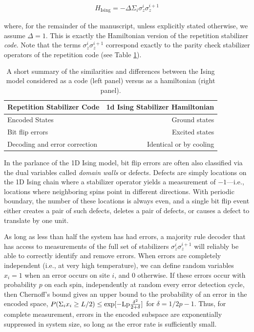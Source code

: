 \documentclass[twocolumn,superscriptaddress,aps,prb,floatfix]{revtex4-1}
\newcommand{\Hising}{H_{\mathrm{Ising}}}
\renewcommand*{\emph}[1]{{\it {#1}}}
\begin{document}
\begin{align}
\Hising = -\Delta \Sigma_i \sigma^i_z \sigma^{i+1}_z
\label{eq:isingham}
\end{align}

where, for the remainder of the manuscript, unless explicitly stated otherwise, we assume $\Delta=1$.  This is exactly the Hamiltonian version of the repetition stabilizer \emph{code}\cite{Freeman2017}.  Note that the terms $\sigma^i_z \sigma^{i+1}_z$ correspond exactly to the parity check stabilizer operators of the repetition code (see Table \ref{tab:code_vs_hamiltonian}).

\begin{table}
\begin{center}
  \begin{tabular}{ l | r }
    \hline
    Repetition Stabilizer Code & 1d Ising Stabilizer Hamiltonian \\ \hline
    Encoded States & Ground states \\ \hline
    Bit flip errors & Excited states \\ \hline
    Decoding and error correction & Identical or by cooling \\ \hline
    \hline
  \end{tabular}
\end{center}
\caption{A short summary of the similarities and differences between the Ising model considered as a code (left panel) versus as a hamiltonian (right panel).}
\label{tab:code_vs_hamiltonian}
\end{table}

In the parlance of the 1D Ising model, bit flip errors are often also classified via the dual variables called \emph{domain walls} or defects.  Defects are simply locations on the 1D Ising chain where a stabilizer operator yields a measurement of $-1$---i.e., locations where neighboring spins point in different directions.  With periodic boundary, the number of these locations is always even, and a single bit flip event either creates a pair of such defects, deletes a pair of defects, or causes a defect to translate by one unit.  

As long as less than half the system has had errors, a majority rule decoder that has access to measurements of the full set of stabilizers ${\sigma^i_z \sigma^{i+1}_z}$ will reliably be able to correctly identify and remove errors.  When errors are completely independent (i.e., at very high temperature), we can define random variables $x_i=1$ when an error occurs on site $i$, and $0$ otherwise.  If these errors occur with probability $p$ on each spin, independently at random every error detection cycle, then Chernoff's bound gives an upper bound to the probability of an error in the encoded space, $P(\Sigma_i x_i \geq L/2) \leq \rm{exp}[-Lp\frac{\delta^2}{2+\delta}]$ for $\delta=1/2p-1$.  Thus, for complete measurement, errors in the encoded subspace are exponentially suppressed in system size, so long as the error rate is sufficiently small.
\end{document}
